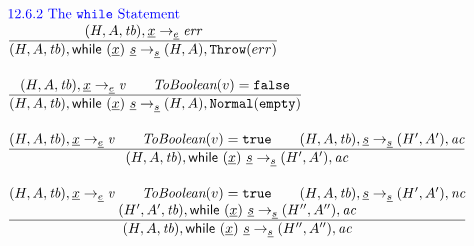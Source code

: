 \documentclass[a4paper, leqno]{amsart}
\newcommand{\rulesep}{\quad\quad}
\newcommand{\stmt}{s}
\newcommand{\expr}{e}
\newcommand{\ir}[1]{\ensuremath{\underline{#1}}}
\newcommand{\irid}{\ir{x}}
\def\inblue{\color{blue}}
\newcommand{\false}{{\tt false}}
\newcommand{\true}{{\tt true}}
\newcommand{\tb}{\emph{tb}}
\newcommand{\ac}{\emph{ac}}
\newcommand{\nc}{\emph{nc}}
\newcommand{\hf}[1]{\emph{#1}}
\newcommand{\void}{{\tt Normal}({\tt empty})}
\newcommand{\state}{\ensuremath{(H,A,\tb)}}
\newcommand{\statep}{\ensuremath{(H',A',\tb)}}
\newcommand{\statel}{\ensuremath{(H,A,\tb)}}
\newcommand{\res}{\ensuremath{(H,A)}}
\newcommand{\resp}{\ensuremath{(H',A')}}
\newcommand{\respp}{\ensuremath{(H'',A'')}}
\newcommand{\evale}{\ensuremath{(H,A,\tb)}}
\newcommand{\irwhile}{\ensuremath{{\sf while} \ {\tt(}\irid{\tt)}\ \ir\stmt}}
\def\inblue{\color{blue}}
\begin{document}
\[
\begin{array}{l@{~~}l@{~~}ll}

\mbox{\inblue 12.6.2 The {\tt while} Statement}\\
\frac{\begin{matrix}
\evale, \irid \rightarrow_{\ir\expr} \emph{err} 
\end{matrix}}
{\begin{matrix}
\state, \irwhile \rightarrow_{\ir{\stmt}} \res,{\tt Throw}(err)
\end{matrix}}
\\[2em]

\frac{\begin{matrix}
\evale, \irid \rightarrow_{\ir\expr} \emph{v} 
\rulesep
\hf{ToBoolean}(v) = \false
\end{matrix}}
{\begin{matrix}
\state, \irwhile \rightarrow_{\ir{\stmt}} \res, \void
\end{matrix}}
\\[2em]

\frac{\begin{matrix}
\evale, \irid \rightarrow_{\ir\expr} \emph{v} 
\rulesep
\hf{ToBoolean}(v) = \true
\rulesep
\statel, \ir\stmt \rightarrow_{\ir\stmt} \resp, \ac
\end{matrix}}
{\begin{matrix}
\state, \irwhile \rightarrow_{\ir{\stmt}} \resp, \ac
\end{matrix}}
\\[2em]


\frac{\begin{matrix}
\evale, \irid \rightarrow_{\ir\expr} \emph{v} 
\rulesep
\hf{ToBoolean}(v) = \true
\rulesep
\statel, \ir\stmt \rightarrow_{\ir\stmt} \resp, \nc
\\
\statep, \irwhile \rightarrow_{\ir{\stmt}} \respp, \ac
\end{matrix}}
{\begin{matrix}
\state, \irwhile \rightarrow_{\ir{\stmt}} \respp, \ac
\end{matrix}}
\\[2em]


\end{array}\]
\end{document}

